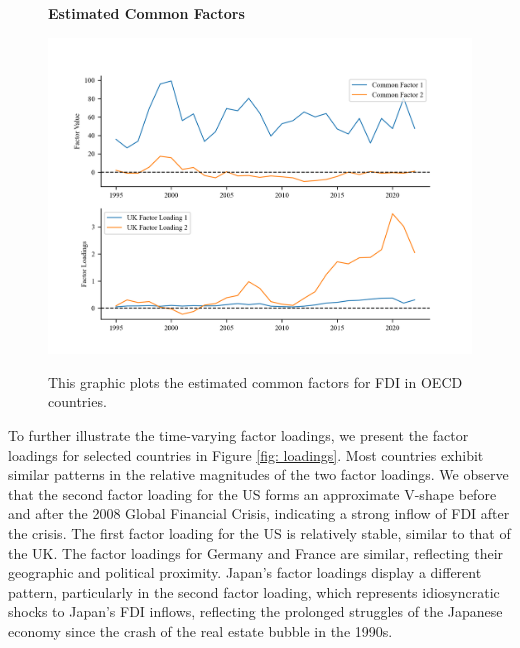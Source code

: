 \documentclass[12pt]{article}
\begin{document}
\begin{figure}[!ht]
    \centering
    \caption{\textbf{Estimated Common Factors}}
    \includegraphics{figs/factors_ipca.png}
    \label{fig: factors}
    \caption*{\footnotesize{This graphic plots the estimated common factors for FDI in OECD countries.}}
\end{figure}

To further illustrate the time-varying factor loadings, we present the factor loadings for selected countries in Figure \ref{fig: loadings}. Most countries exhibit similar patterns in the relative magnitudes of the two factor loadings. We observe that the second factor loading for the US forms an approximate V-shape before and after the 2008 Global Financial Crisis, indicating a strong inflow of FDI after the crisis. The first factor loading for the US is relatively stable, similar to that of the UK. The factor loadings for Germany and France are similar, reflecting their geographic and political proximity. Japan's factor loadings display a different pattern, particularly in the second factor loading, which represents idiosyncratic shocks to Japan's FDI inflows, reflecting the prolonged struggles of the Japanese economy since the crash of the real estate bubble in the 1990s.
\end{document}
